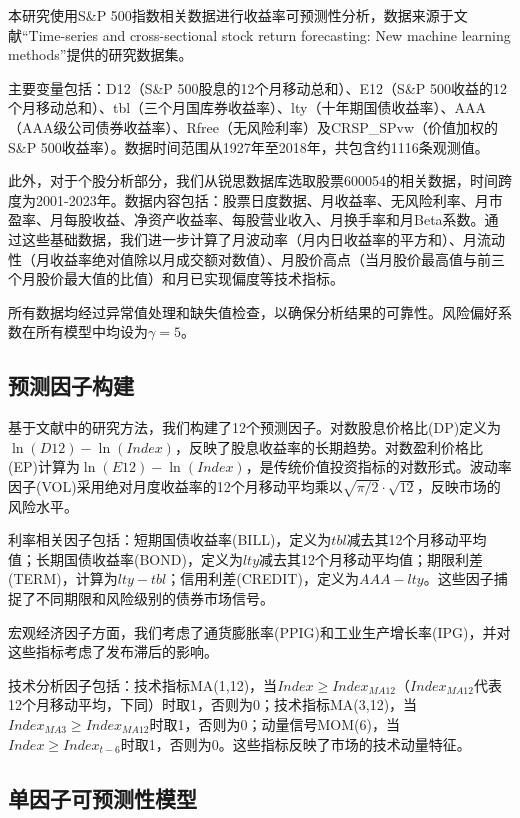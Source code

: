 \documentclass[12pt, a4paper]{article}
\begin{document}
本研究使用S\&P 500指数相关数据进行收益率可预测性分析，数据来源于文献“Time-series and cross-sectional stock return forecasting: New machine learning methods”提供的研究数据集。

主要变量包括：D12（S\&P 500股息的12个月移动总和）、E12（S\&P 500收益的12个月移动总和）、tbl（三个月国库券收益率）、lty（十年期国债收益率）、AAA（AAA级公司债券收益率）、Rfree（无风险利率）及CRSP\_SPvw（价值加权的S\&P 500收益率）。数据时间范围从1927年至2018年，共包含约1116条观测值。

此外，对于个股分析部分，我们从锐思数据库选取股票600054的相关数据，时间跨度为2001-2023年。数据内容包括：股票日度数据、月收益率、无风险利率、月市盈率、月每股收益、净资产收益率、每股营业收入、月换手率和月Beta系数。通过这些基础数据，我们进一步计算了月波动率（月内日收益率的平方和）、月流动性（月收益率绝对值除以月成交额对数值）、月股价高点（当月股价最高值与前三个月股价最大值的比值）和月已实现偏度等技术指标。

所有数据均经过异常值处理和缺失值检查，以确保分析结果的可靠性。风险偏好系数在所有模型中均设为$\gamma = 5$。

\subsection{预测因子构建}

基于文献中的研究方法，我们构建了12个预测因子。对数股息价格比(DP)定义为$\ln(D12) - \ln(Index)$，反映了股息收益率的长期趋势。对数盈利价格比(EP)计算为$\ln(E12) - \ln(Index)$，是传统价值投资指标的对数形式。波动率因子(VOL)采用绝对月度收益率的12个月移动平均乘以$\sqrt{\pi/2} \cdot \sqrt{12}$，反映市场的风险水平。

利率相关因子包括：短期国债收益率(BILL)，定义为$tbl$减去其12个月移动平均值；长期国债收益率(BOND)，定义为$lty$减去其12个月移动平均值；期限利差(TERM)，计算为$lty - tbl$；信用利差(CREDIT)，定义为$AAA - lty$。这些因子捕捉了不同期限和风险级别的债券市场信号。

宏观经济因子方面，我们考虑了通货膨胀率(PPIG)和工业生产增长率(IPG)，并对这些指标考虑了发布滞后的影响。

技术分析因子包括：技术指标MA(1,12)，当$Index \geq Index_{MA12}$（$Index_{MA12}$代表12个月移动平均，下同）时取1，否则为0；技术指标MA(3,12)，当$Index_{MA3} \geq Index_{MA12}$时取1，否则为0；动量信号MOM(6)，当$Index \geq Index_{t-6}$时取1，否则为0。这些指标反映了市场的技术动量特征。

\subsection{单因子可预测性模型}
\end{document}
